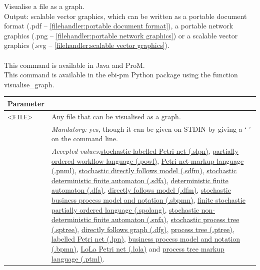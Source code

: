 {\label{command:Ebi visualise graph}
Visualise a file as a graph.\\
\noindent Output: scalable vector graphics, which can be written as a portable document format (.pdf -- \cref{filehandler:portable document format}), a portable network graphics (.png -- \cref{filehandler:portable network graphics}) or a scalable vector graphics (.svg -- \cref{filehandler:scalable vector graphics}).\\
\\This command is available in Java and ProM.
\\This command is available in the ebi-pm Python package using the function visualise\_graph.
\begin{tabularx}{\linewidth}{lX}
\toprule
Parameter \\\midrule
<\texttt{FILE}>&Any file that can be visualised as a graph.\\
&\textit{Mandatory:} \quad yes, though it can be given on STDIN by giving a `-' on the command line.\\
&\textit{Accepted values:}\quad \hyperref[filehandler:stochastic labelled Petri net]{stochastic labelled Petri net (.slpn)}, \hyperref[filehandler:partially ordered workflow language]{partially ordered workflow language (.powl)}, \hyperref[filehandler:Petri net markup language]{Petri net markup language (.pnml)}, \hyperref[filehandler:stochastic directly follows model]{stochastic directly follows model (.sdfm)}, \hyperref[filehandler:stochastic deterministic finite automaton]{stochastic deterministic finite automaton (.sdfa)}, \hyperref[filehandler:deterministic finite automaton]{deterministic finite automaton (.dfa)}, \hyperref[filehandler:directly follows model]{directly follows model (.dfm)}, \hyperref[filehandler:stochastic business process model and notation]{stochastic business process model and notation (.sbpmn)}, \hyperref[filehandler:finite stochastic partially ordered language]{finite stochastic partially ordered language (.spolang)}, \hyperref[filehandler:stochastic non-deterministic finite automaton]{stochastic non-deterministic finite automaton (.snfa)}, \hyperref[filehandler:stochastic process tree]{stochastic process tree (.sptree)}, \hyperref[filehandler:directly follows graph]{directly follows graph (.dfg)}, \hyperref[filehandler:process tree]{process tree (.ptree)}, \hyperref[filehandler:labelled Petri net]{labelled Petri net (.lpn)}, \hyperref[filehandler:business process model and notation]{business process model and notation (.bpmn)}, \hyperref[filehandler:LoLa Petri net]{LoLa Petri net (.lola)} and \hyperref[filehandler:process tree markup language]{process tree markup language (.ptml)}.\\

\end{tabularx}}
